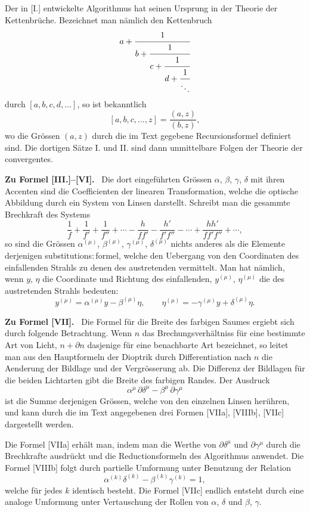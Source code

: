 \documentclass[12pt,a4paper]{article}
\theoremstyle{plain}
\theoremstyle{definition}
\theoremstyle{remark}
\begin{document}
Der in [I.] entwickelte Algorithmus hat seinen Ursprung in der
Theorie der Kettenbr\"uche. Bezeichnet man n\"amlich den Kettenbruch
\[
a + \cfrac{1}{b + \cfrac{1}{c + \cfrac{1}{d + \cfrac{1}{\ddots}}}}
\]
durch $[a, b, c, d, \ldots]$, so ist bekanntlich
\[
[a, b, c, \ldots, z] = \frac{(a,z)}{(b,z)},
\]
wo die Gr\"ossen $(a,z)$ durch die im Text gegebene Recursionsformel
definiert sind. Die dortigen S\"atze I. und II. sind dann
unmittelbare Folgen der Theorie der convergentes.

\medskip

\textbf{Zu Formel [III.]--[VI].} \ Die dort eingef\"uhrten Gr\"ossen
$\alpha$, $\beta$, $\gamma$, $\delta$ mit ihren Accenten sind die
Coefficienten der linearen Transformation, welche die optische
Abbildung durch ein System von Linsen darstellt. Schreibt man die
gesammte Brechkraft des Systems
\[
\frac{1}{f} + \frac{1}{f'} + \frac{1}{f''} + \cdots
- \frac{h}{ff'} - \frac{h'}{f'f''} - \cdots
+ \frac{hh'}{ff'f''} + \cdots,
\]
so sind die Gr\"ossen $\alpha^{(\mu)}$, $\beta^{(\mu)}$,
$\gamma^{(\mu)}$, $\delta^{(\mu)}$ nichts anderes als die Elemente
derjenigen substitutions:\,formel, welche den Uebergang von den
Coordinaten des einfallenden Strahls zu denen des austretenden
vermittelt. Man hat n\"amlich, wenn $y$, $\eta$ die Coordinate und
Richtung des einfallenden, $y^{(\mu)}$, $\eta^{(\mu)}$ die des
austretenden Strahls bedeuten:
\[
y^{(\mu)} = \alpha^{(\mu)} y - \beta^{(\mu)} \eta,\qquad
\eta^{(\mu)} = -\gamma^{(\mu)} y + \delta^{(\mu)} \eta.
\]

\medskip

\textbf{Zu Formel [VII].} \ Die Formel f\"ur die Breite des farbigen
Saumes ergiebt sich durch folgende Betrachtung. Wenn $n$ das
Brechungsverh\"altniss f\"ur eine bestimmte Art von Licht, $n + \partial n$
dasjenige f\"ur eine benachbarte Art bezeichnet, so leitet man aus
den Hauptformeln der Dioptrik durch Differentiation nach $n$ die
Aenderung der Bildlage und der Vergr\"osserung ab. Die Differenz der
Bildlagen f\"ur die beiden Lichtarten gibt die Breite des farbigen
Randes. Der Ausdruck
\[
\alpha^{\mu}\,\partial\delta^{\mu} - \beta^{\mu}\,\partial\gamma^{\mu}
\]
ist die Summe derjenigen Gr\"ossen, welche von den einzelnen Linsen
her\"uhren, und kann durch die im Text angegebenen drei Formen
[VIIa], [VIIIb], [VIIc] dargestellt werden.

Die Formel [VIIa] erh\"alt man, indem man die Werthe von
$\partial\delta^{\mu}$ und $\partial\gamma^{\mu}$ durch die
Brechkrafte ausdr\"uckt und die Reductionsformeln des Algorithmus
anwendet. Die Formel [VIIIb] folgt durch partielle Umformung unter
Benutzung der Relation
\[
\alpha^{(k)}\delta^{(k)} - \beta^{(k)}\gamma^{(k)} = 1,
\]
welche f\"ur jedes $k$ identisch besteht. Die Formel [VIIc] endlich
entsteht durch eine analoge Umformung unter Vertauschung der Rollen
von $\alpha$, $\delta$ und $\beta$, $\gamma$.
\end{document}
